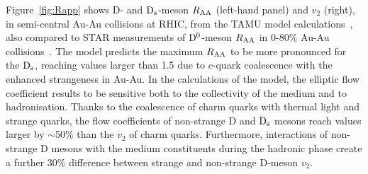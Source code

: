 Figure~\ref{fig:Rapp} shows D- and ${\rm D_s}$-meson $R_{\rm AA}$ (left-hand panel)
and $v_2$ (right), in semi-central Au-Au collisions at 
RHIC, from the TAMU model calculations~\cite{He:2012df}, also
compared to STAR measurements of ${\rm D^0}$-meson $R_{\rm AA}$ in 0-80\% Au-Au 
collisions~\cite{Zhang:2011uva}.
The model predicts the maximum $R_{\rm AA}$ to be more 
pronounced for the ${\rm D_s}$, reaching values larger than 1.5 due 
to $c$-quark coalescence with the enhanced strangeness in Au-Au.
In the calculations of the model, the elliptic flow coefficient results to be sensitive both 
to the collectivity of the medium and to hadronisation. Thanks to the coalescence of charm quarks with 
thermal light and strange quarks, the flow coefficients of non-strange D and ${\rm D_s}$ mesons reach
values larger by $\sim$50\% than the $v_2$ of charm quarks. Furthermore, interactions of non-strange D mesons
with the medium constituents during the hadronic phase create a further 30\%
difference between strange and non-strange D-meson $v_2$.

